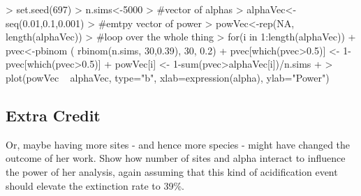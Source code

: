 \documentclass{article}
\begin{document}
\begin{Schunk}
\begin{Sinput}
> set.seed(697)
> n.sims<-5000
> #vector of alphas
> alphaVec<-seq(0.01,0.1,0.001)
> #emtpy vector of power
> powVec<-rep(NA, length(alphaVec))
> #loop over the whole thing
> for(i in 1:length(alphaVec)){
+   pvec<-pbinom ( rbinom(n.sims, 30,0.39), 30, 0.2)
+   pvec[which(pvec>0.5)] <- 1-pvec[which(pvec>0.5)]
+   powVec[i] <- 1-sum(pvec>alphaVec[i])/n.sims
+ }
> plot(powVec ~ alphaVec, type="b", xlab=expression(alpha), ylab="Power")
\end{Sinput}
\end{Schunk}


\subsection{Extra Credit} Or, maybe having more sites - and hence more species - might have changed the outcome of her work.  Show how number of sites and alpha interact to influence the power of her analysis, again assuming that this kind of acidification event should elevate the extinction rate to 39\%.
\begin{Schunk}
\end{Schunk}
\end{document}
